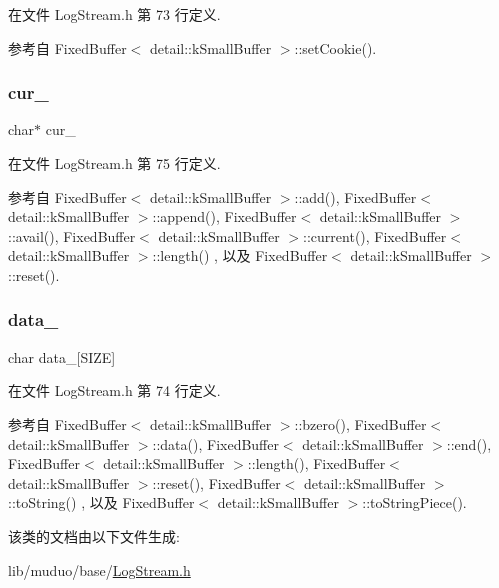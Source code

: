 在文件 Log\+Stream.\+h 第 73 行定义.



参考自 Fixed\+Buffer$<$ detail\+::k\+Small\+Buffer $>$\+::set\+Cookie().

\mbox{\label{classmuduo_1_1detail_1_1FixedBuffer_ad1ee918c4fe42ae1767d186beebf9778}} 
\subsubsection{\texorpdfstring{cur\+\_\+}{cur\_}}
{\footnotesize\ttfamily char$\ast$ cur\+\_\+\hspace{0.3cm}{\ttfamily [private]}}



在文件 Log\+Stream.\+h 第 75 行定义.



参考自 Fixed\+Buffer$<$ detail\+::k\+Small\+Buffer $>$\+::add(), Fixed\+Buffer$<$ detail\+::k\+Small\+Buffer $>$\+::append(), Fixed\+Buffer$<$ detail\+::k\+Small\+Buffer $>$\+::avail(), Fixed\+Buffer$<$ detail\+::k\+Small\+Buffer $>$\+::current(), Fixed\+Buffer$<$ detail\+::k\+Small\+Buffer $>$\+::length() , 以及 Fixed\+Buffer$<$ detail\+::k\+Small\+Buffer $>$\+::reset().

\mbox{\label{classmuduo_1_1detail_1_1FixedBuffer_a54258af31252262daa68a893089d7a88}} 
\subsubsection{\texorpdfstring{data\+\_\+}{data\_}}
{\footnotesize\ttfamily char data\+\_\+\mbox{[}S\+I\+ZE\mbox{]}\hspace{0.3cm}{\ttfamily [private]}}



在文件 Log\+Stream.\+h 第 74 行定义.



参考自 Fixed\+Buffer$<$ detail\+::k\+Small\+Buffer $>$\+::bzero(), Fixed\+Buffer$<$ detail\+::k\+Small\+Buffer $>$\+::data(), Fixed\+Buffer$<$ detail\+::k\+Small\+Buffer $>$\+::end(), Fixed\+Buffer$<$ detail\+::k\+Small\+Buffer $>$\+::length(), Fixed\+Buffer$<$ detail\+::k\+Small\+Buffer $>$\+::reset(), Fixed\+Buffer$<$ detail\+::k\+Small\+Buffer $>$\+::to\+String() , 以及 Fixed\+Buffer$<$ detail\+::k\+Small\+Buffer $>$\+::to\+String\+Piece().



该类的文档由以下文件生成\+:\begin{DoxyCompactItemize}
\item 
lib/muduo/base/\hyperlink{LogStream_8h}{Log\+Stream.\+h}\end{DoxyCompactItemize}
